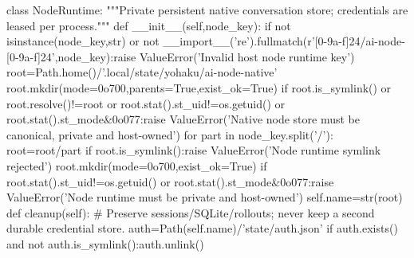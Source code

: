 class NodeRuntime:
    """Private persistent native conversation store; credentials are leased per process."""
    def __init__(self,node_key):
        if not isinstance(node_key,str) or not __import__('re').fullmatch(r'[0-9a-f]{24}/ai-node-[0-9a-f]{24}',node_key):raise ValueError('Invalid host node runtime key')
        root=Path.home()/'.local/state/yohaku/ai-node-native'
        root.mkdir(mode=0o700,parents=True,exist_ok=True)
        if root.is_symlink() or root.resolve()!=root or root.stat().st_uid!=os.getuid() or root.stat().st_mode&0o077:raise ValueError('Native node store must be canonical, private and host-owned')
        for part in node_key.split('/'):
            root=root/part
            if root.is_symlink():raise ValueError('Node runtime symlink rejected')
            root.mkdir(mode=0o700,exist_ok=True)
            if root.stat().st_uid!=os.getuid() or root.stat().st_mode&0o077:raise ValueError('Node runtime must be private and host-owned')
        self.name=str(root)
    def cleanup(self):
        # Preserve sessions/SQLite/rollouts; never keep a second durable credential store.
        auth=Path(self.name)/'state/auth.json'
        if auth.exists() and not auth.is_symlink():auth.unlink()


